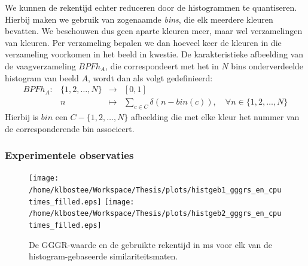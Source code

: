 We kunnen de rekentijd echter reduceren door de histogrammen te quantiseren. Hierbij
maken we gebruik van zogenaamde \emph{bins}, die elk meerdere kleuren bevatten. We beschouwen dus 
geen aparte kleuren meer, maar wel verzamelingen van kleuren. Per verzameling bepalen we dan 
hoeveel keer de kleuren in die verzameling voorkomen 
in het beeld in kwestie. De karakteristieke afbeelding van de vaagverzameling $\mathit{BPFh}_A$, die
correspondeert met het in $N$ bins onderverdeelde histogram van beeld $A$, wordt dan als volgt
gedefinieerd:  
$$
\begin{array}{lrcl}
\mathit{BPFh}_A: 	& \{1,2,\ldots,N\} 	& \to 		& [0,1] \\[5pt]
		& n						& \mapsto	& \displaystyle\sum_{c \in C} \delta (n -  bin(c)),
\quad\forall n \in \{1,2,\ldots,N\}
\end{array}
$$
Hierbij is $bin$ een $C - \{1,2,\ldots,N\}$ afbeelding die met elke kleur het nummer van de 
corresponderende bin associeert. 




\subsubsection{Experimentele observaties}


\begin{figure}[tbp]
\begin{center}
\texttt{[image: /home/klbostee/Workspace/Thesis/plots/histgeb1\_gggrs\_en\_cputimes\_filled.eps]}
\texttt{[image: /home/klbostee/Workspace/Thesis/plots/histgeb2\_gggrs\_en\_cputimes\_filled.eps]}
\caption{\label{fig:histgeb_gggrs_en_cputimes}De GGGR-waarde en de gebruikte rekentijd in ms voor elk van de histogram-gebaseerde similariteitsmaten.}
\end{center}
\end{figure}

